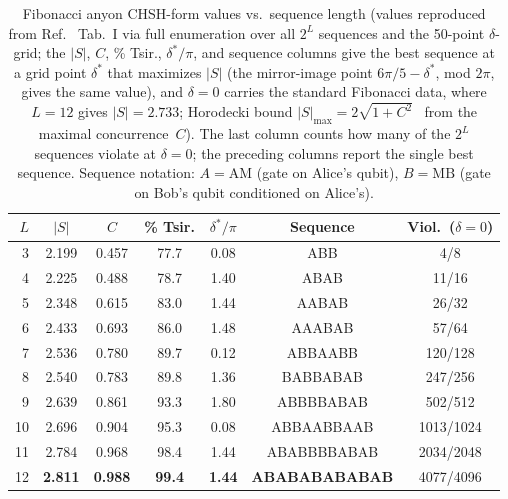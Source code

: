 \documentclass[aps,pra,twocolumn,superscriptaddress,showpacs,floatfix]{revtex4-2}
\begin{document}
\begin{table}[b]
\caption{Fibonacci anyon CHSH-form values vs.\ sequence length
(values reproduced from Ref.~\cite{Sayim2026fibonacci} Tab.~I via full enumeration
over all $2^L$ sequences and the 50-point $\delta$-grid; the $|S|$, $C$, \%
Tsir., $\delta^*/\pi$, and sequence columns give the best sequence at a grid
point $\delta^*$ that maximizes $|S|$ (the mirror-image point
$6\pi/5-\delta^*$, mod $2\pi$, gives the same value),
and $\delta = 0$ carries the standard Fibonacci data, where
$L = 12$ gives $|S| = 2.733$; Horodecki bound
$|S|_{\max} = 2\sqrt{1+C^2}$~\cite{Horodecki1995} from the maximal
concurrence~$C$).  The last column counts how many of the $2^L$ sequences
violate at $\delta = 0$; the preceding columns report the single best sequence.
Sequence notation: $A = \text{AM}$ (gate on Alice's qubit), $B = \text{MB}$
(gate on Bob's qubit conditioned on Alice's).}
\label{tab:fibonacci}
\scriptsize
\begin{ruledtabular}
\begin{tabular}{rcccccc} $L$ & $|S|$ & $C$ & \% Tsir. & $\delta^*/\pi$ &
Sequence & Viol.\ ($\delta{=}0$) \\
\hline
 3 & 2.199 & 0.457 & 77.7 & 0.08 & ABB & 4/8 \\
 4 & 2.225 & 0.488 & 78.7 & 1.40 & ABAB & 11/16 \\
 5 & 2.348 & 0.615 & 83.0 & 1.44 & AABAB & 26/32 \\
 6 & 2.433 & 0.693 & 86.0 & 1.48 & AAABAB & 57/64 \\
 7 & 2.536 & 0.780 & 89.7 & 0.12 & ABBAABB & 120/128 \\
 8 & 2.540 & 0.783 & 89.8 & 1.36 & BABBABAB & 247/256 \\
 9 & 2.639 & 0.861 & 93.3 & 1.80 & ABBBBABAB & 502/512 \\
10 & 2.696 & 0.904 & 95.3 & 0.08 & ABBAABBAAB & 1013/1024 \\
11 & 2.784 & 0.968 & 98.4 & 1.44 & ABABBBBABAB & 2034/2048 \\
12 & \textbf{2.811} & \textbf{0.988} & \textbf{99.4} & \textbf{1.44} & \textbf{ABABABABABAB} & 4077/4096 \\\end{tabular}
\end{ruledtabular}
\end{table}
\end{document}
